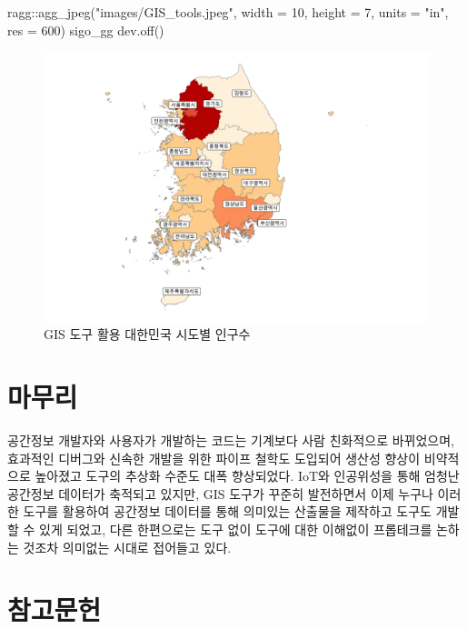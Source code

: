 \documentclass[
  a4paper,showtrims,openright,hidelinks]{oblivoir}
\newenvironment{Shaded}{\begin{snugshade}}{\end{snugshade}}
\newcommand{\AttributeTok}[1]{\textcolor[rgb]{0.40,0.45,0.13}{#1}}
\newcommand{\DecValTok}[1]{\textcolor[rgb]{0.68,0.00,0.00}{#1}}
\newcommand{\FunctionTok}[1]{\textcolor[rgb]{0.28,0.35,0.67}{#1}}
\newcommand{\NormalTok}[1]{\textcolor[rgb]{0.00,0.23,0.31}{#1}}
\newcommand{\SpecialCharTok}[1]{\textcolor[rgb]{0.37,0.37,0.37}{#1}}
\newcommand{\StringTok}[1]{\textcolor[rgb]{0.13,0.47,0.30}{#1}}
\begin{document}
\begin{Shaded}
\begin{Highlighting}[]
\NormalTok{ragg}\SpecialCharTok{::}\FunctionTok{agg\_jpeg}\NormalTok{(}\StringTok{"images/GIS\_tools.jpeg"}\NormalTok{,}
               \AttributeTok{width =} \DecValTok{10}\NormalTok{, }\AttributeTok{height =} \DecValTok{7}\NormalTok{, }\AttributeTok{units =} \StringTok{"in"}\NormalTok{, }\AttributeTok{res =} \DecValTok{600}\NormalTok{)}
\NormalTok{sigo\_gg}
\FunctionTok{dev.off}\NormalTok{()}
\end{Highlighting}
\end{Shaded}

\begin{figure}[H]

{\centering \includegraphics{images/GIS_tools.jpeg}

}

\caption{GIS 도구 활용 대한민국 시도별 인구수}

\end{figure}%

\section{마무리}\label{uxb9c8uxbb34uxb9ac}

공간정보 개발자와 사용자가 개발하는 코드는 기계보다 사람 친화적으로
바뀌었으며, 효과적인 디버그와 신속한 개발을 위한 파이프 철학도 도입되어
생산성 향상이 비약적으로 높아졌고 도구의 추상화 수준도 대폭 향상되었다.
IoT와 인공위성을 통해 엄청난 공간정보 데이터가 축적되고 있지만, GIS
도구가 꾸준히 발전하면서 이제 누구나 이러한 도구를 활용하여 공간정보
데이터를 통해 의미있는 산출물을 제작하고 도구도 개발할 수 있게 되었고,
다른 한편으로는 도구 없이 도구에 대한 이해없이 프롭테크를 논하는 것조차
의미없는 시대로 접어들고 있다.

\section*{참고문헌}\label{uxcc38uxace0uxbb38uxd5cc}

\printbibliography[heading=none]
\end{document}
